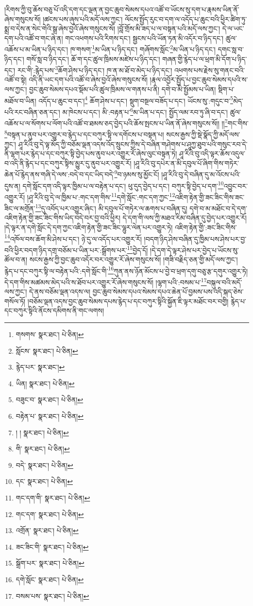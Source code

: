 །རིགས་ཀྱི་བུ་ཆོས་བཅུ་པོ་འདི་དག་དང་ལྡན་ན་བྱང་ཆུབ་སེམས་དཔའ་འཚོ་བ་ཡོངས་སུ་དག་པ་རྣམས་ཡིན་ནོ་ཞེས་གསུངས་སོ། །ཚངས་པས་ཞུས་པའི་མདོ་ལས་ཀྱང་། ལོངས་སྤྱོད་རུང་བ་དག་ལ་འདོད་པ་ཆུང་བའི་ཕྱིར་ཚིག་ཏུ་སྨྲ་བ་དེས་ན་སེང་གེའི་སྒྲ་ཞེས་བྱའོ་ཞེས་གསུངས་སོ། །བློ་གྲོས་མི་ཟད་པ་ལ་བསྟན་པའི་མདོ་ལས་ཀྱང་། དེ་ལ་ཡང་དག་པའི་འཚོ་བ་གང་ཞེ་ན། གང་འཕགས་པའི་རིགས་དང་། སྦྱངས་པའི་ཡོན་ཏན་མི་འདོར་བ་ཉིད་དང་། ཚུལ་འཆོས་པ་མ་ཡིན་པ་ཉིད་དང་། ཁ་གསག་\footnote{གསགས་  སྣར་ཐང་།  པེ་ཅིན། }མ་ཡིན་པ་ཉིད་དང་། གཞོགས་སློང་\footnote{སློངས་  སྣར་ཐང་།  པེ་ཅིན། }མ་ཡིན་པ་ཉིད་དང་། དགང་སླ་བ་ཉིད་དང་། གསོ་སླ་བ་ཉིད་དང་། ཆོ་ག་དང་ཚུལ་ཁྲིམས་མཛེས་པ་ཉིད་དང་། གཞན་གྱི་རྙེད་པ་ལ་ཕྲག་མི་དོག་པ་ཉིད་དང་། རང་གི་:རྙེད་པས་\footnote{རྙེད་པར་  སྣར་ཐང་། }ཆོག་ཤེས་པ་ཉིད་དང་། ཁ་ན་མ་ཐོ་བ་མེད་པ་ཉིད་དང་། འཕགས་པས་རྗེས་སུ་གནང་བའི་འཚོ་བ་སྟེ། འདི་ནི་ཡང་དག་པའི་འཚོ་བ་ཞེས་བྱའོ་ཞེས་གསུངས་སོ། །རྣལ་འབྱོར་སྤྱོད་པ་བྱང་ཆུབ་སེམས་དཔའི་ས་ལས་ཀྱང་། བྱང་ཆུབ་སེམས་དཔའ་སྡོམ་པའི་ཚུལ་ཁྲིམས་ལ་གནས་པ་ནི། དགེ་བ་མི་སྤྱོམས་པ་ཡིན། སྡིག་པ་མཐོལ་བ་ཡིན། འདོད་པ་ཆུང་བ་དང་།\footnote{ཡིན།  སྣར་ཐང་།  པེ་ཅིན། } ཆོག་ཤེས་པ་དང་། སྡུག་བསྔལ་བཟོད་པ་དང་། ཡོངས་སུ་:གདུང་བ་\footnote{བཟུང་བ་  སྣར་ཐང་།  པེ་ཅིན། }མེད་པའི་རང་བཞིན་ཅན་དང་། མ་ཁེངས་པ་དང་། མི་:བརྟན་པ་\footnote{བརྟེན་པ་  སྣར་ཐང་།  པེ་ཅིན། }མ་ཡིན་པ་དང་། སྤྱོད་ལམ་རབ་ཏུ་ཞི་བ་དང་། ཚུལ་འཆོས་པ་ལ་སོགས་པ་ལོག་པའི་འཚོ་བ་ཐམས་ཅད་བྱེད་པའི་ཆོས་སྤངས་པ་ཡིན་ནོ་ཞེས་གསུངས་སོ།། །།\footnote{། །  སྣར་ཐང་།  པེ་ཅིན། }གང་གིས་\footnote{གི་  སྣར་ཐང་།  པེ་ཅིན། }བསྟན་པ་ནུབ་པར་འགྱུར་བ་རྙེད་པ་དང་བཀུར་སྟི་ལ་དགོངས་པ་བསྟན་པ། སངས་རྒྱས་ཀྱི་སྡེ་སྣོད་ཀྱི་མདོ་ལས་ཀྱང་། ཤཱ་རིའི་བུ་དེ་ལྟ་མོད་ཀྱི་བཅོམ་ལྡན་འདས་འོད་སྲུངས་ཀྱིས་དེ་བཞིན་གཤེགས་པ་ཤཱཀྱ་ཐུབ་པའི་གསུང་རབ་དེ་ནི་ལྷག་པར་རྙེད་པ་དང་བཀུར་སྟི་བྱེད་པས་ནུབ་པར་འགྱུར་རོ་ཞེས་ལུང་བསྟན་ཏེ། ཤཱ་རིའི་བུ་འདི་ལྟར་ཆོས་འདུལ་བ་འདི་ནི་རྙེད་པ་དང་བཀུར་སྟིས་མྱུར་དུ་ནུབ་པར་འགྱུར་རོ། །ཤཱ་རིའི་བུ་དཔེར་ན་མི་དབུལ་པོ་ཞིག་གིས་གཏེར་ཆེན་པོ་རྙེད་ནས་གཞི་དེ་ལས་:བདེ་བ་དང་ཡིད་བདེ་\footnote{བདེ་  སྣར་ཐང་།  པེ་ཅིན། }བ་ཉམས་སུ་མྱོང་ངོ། །ཤཱ་རིའི་བུ་དེ་བཞིན་དུ་མ་འོངས་པའི་དུས་ན། དགེ་སློང་དག་འདི་ལྟར་ཁྱིམ་པ་ལ་བརྟེན་པ་དང་། ཕུ་དུད་བྱེད་པ་དང་། བཀུར་སྟི་བྱེད་པ་དག་\footnote{དང་  སྣར་ཐང་།  པེ་ཅིན། }འབྱུང་བར་འགྱུར་རོ། །ཤཱ་རིའི་བུ་དེ་ལ་ཁྱིམ་པ་:གང་དག་གིས་\footnote{གང་དག་གི་  སྣར་ཐང་།  པེ་ཅིན། }དགེ་སློང་:གང་དག་ཀྱང་\footnote{གང་དག་  སྣར་ཐང་།  པེ་ཅིན། }འཇིག་རྟེན་གྱི་ཟང་ཟིང་གིས་ཟང་ཟིང་ལ་མགྲོན་\footnote{འགྲོན་  སྣར་ཐང་།  པེ་ཅིན། }དུ་འབོད་པར་འགྱུར་ཞིང་། མི་དབུལ་པོ་གཏེར་ལ་ཆགས་པ་བཞིན་དུ། དགེ་བ་མ་མཐོང་བ་དེ་དག་འཇིག་རྟེན་གྱི་ཟང་ཟིང་གིས་ཡིད་བདེ་བར་བྱ་བའི་ཕྱིར། དེ་དག་གི་ལས་ཀྱི་མཐའ་རིམ་བཞིན་དུ་བྱེད་པར་འགྱུར་རོ། །དེ་ལྟར་ན་དགེ་སློང་དེ་དག་ཀྱང་འཇིག་རྟེན་གྱི་ཟང་ཟིང་ལྷུར་ལེན་པར་འགྱུར་ཏེ། འཇིག་རྟེན་གྱི་:ཟང་ཟིང་གིས་\footnote{ཟང་ཟིང་གི་  སྣར་ཐང་།  པེ་ཅིན། }འཁོལ་བས་ཆོག་མི་ཤེས་པ་དང་། ཉེ་དུ་ལ་འདོད་པར་འགྱུར་རོ། །བདག་ཉིད་ཤེས་བཞིན་དུ་ཁྱིམ་པས་ཤེས་པར་བྱ་བའི་ཕྱིར་བདག་ཉིད་དགྲ་བཅོམ་པ་ཡིན་པར་:སྒྲོགས་པར་\footnote{སྒྲོག་པར་  སྣར་ཐང་།  པེ་ཅིན། }བྱེད་དོ། །དེ་དག་དེ་ལྟར་ཤེས་པར་བྱེད་པ་ཡོངས་སུ་ཚོལ་བ་ན། སངས་རྒྱས་ཀྱི་བྱང་ཆུབ་འདོར་བར་འགྱུར་རོ་ཞེས་གསུངས་སོ། །གཟི་བརྗིད་ཅན་གྱི་མདོ་ལས་ཀྱང་། རྙེད་པ་དང་བཀུར་སྟི་ལ་བརྟེན་པའི་:དགེ་སློང་གི་\footnote{དགེ་སློང་  སྣར་ཐང་།  པེ་ཅིན། }ཀུན་ནས་ཉོན་མོངས་པ་བྱེ་བ་ཕྲག་དགུ་བཅུ་རྩ་དགུར་འགྱུར་ཏེ། དེ་དག་གིས་མཚམས་མེད་པའི་ས་ཐོབ་པར་འགྱུར་རོ་ཞེས་གསུངས་སོ། །ལྷག་པའི་:བསམ་པ་\footnote{བསམ་པས་  སྣར་ཐང་།  པེ་ཅིན། }བསྐུལ་བའི་མདོ་ལས་ཀྱང་། དེ་ནས་བཅོམ་ལྡན་འདས་ལ། བྱང་ཆུབ་སེམས་དཔའ་སེམས་དཔའ་ཆེན་པོ་བྱམས་པས་འདི་སྐད་ཅེས་གསོལ་ཏོ། །བཅོམ་ལྡན་འདས་བྱང་ཆུབ་སེམས་དཔས་རྙེད་པ་དང་བཀུར་སྟིའི་སྐྱོན་ཇི་ལྟར་མཐོང་བར་བགྱི། རྙེད་པ་དང་བཀུར་སྟིའི་ནོངས་དམིགས་ནི་གང་ལགས། 
